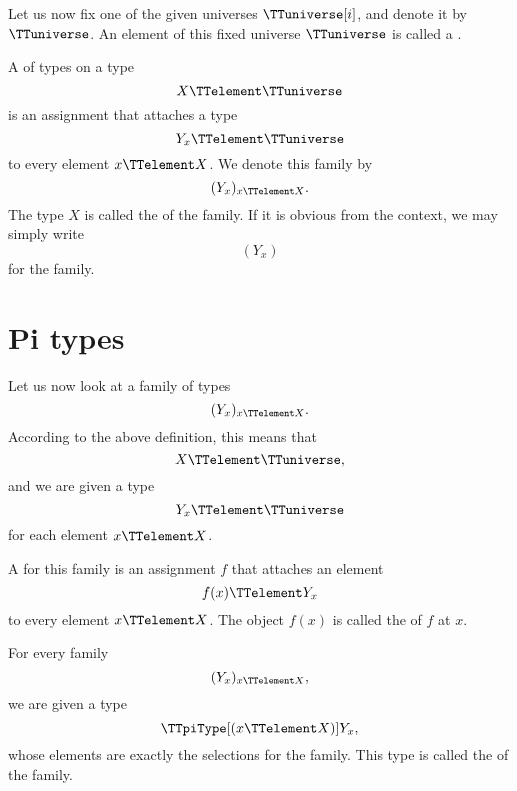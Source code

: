 \documentclass{article}
\begin{document}
Let us now fix one of the given universes $\TTuniverse[i]$, and denote
it by $\TTuniverse$.  An element of this fixed universe $\TTuniverse$
is called a .

A  of types on a type
\begin{equation*}
  X \TTelement \TTuniverse
\end{equation*}
is an assignment that attaches a type
\begin{equation*}
  Y_x \TTelement \TTuniverse
\end{equation*}
to every element $x \TTelement X$.  We denote this family by
\begin{equation*}
  (Y_x)_{x \TTelement X}.
\end{equation*}
The type $X$ is called the  of the family.  If it is
obvious from the context, we may simply write
\begin{equation*}
  (Y_x)
\end{equation*}
for the family.

\section{Pi types}
\label{sec:pi-types}

Let us now look at a family of types
\begin{equation*}
  (Y_x)_{x \TTelement X}.
\end{equation*}
According to the above definition, this means that
\begin{equation*}
  X \TTelement \TTuniverse,
\end{equation*}
and we are given a type
\begin{equation*}
  Y_x \TTelement \TTuniverse
\end{equation*}
for each element $x \TTelement X$.

A  for this family is an assignment $f$ that
attaches an element
\begin{equation*}
  f(x) \TTelement Y_x
\end{equation*}
to every element $x \TTelement X$.  The object $f(x)$ is called the
 of $f$ at $x$.

For every family
\begin{equation*}
  (Y_x)_{x \TTelement X},
\end{equation*}
we are given a type
\begin{equation*}
  \TTpiType[(x \TTelement X)] Y_x,
\end{equation*}
whose elements are exactly the selections for the family.  This type
is called the  of the family.
\end{document}

